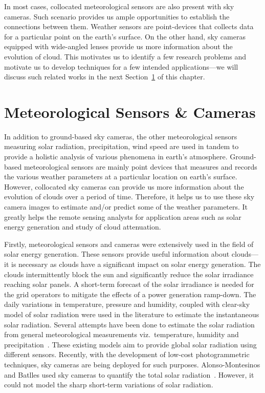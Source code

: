 In most cases, collocated meteorological sensors are also present with sky cameras. Such scenario provides us ample opportunities to establish the connections between them. Weather sensors are point-devices that collects data for a particular point on the earth's surface. On the other hand, sky cameras equipped with wide-angled lenses provide us more information about the evolution of cloud. This motivates us to identify a few research problems and motivate us to develop techniques for a few intended applications---we will discuss such related works in the next Section~\ref{sec:lit-sensor} of this chapter.

\section{Meteorological Sensors \& Cameras}
\label{sec:lit-sensor}
In addition to ground-based sky cameras, the other meteorological sensors measuring solar radiation, precipitation, wind speed are used in tandem to provide a holistic analysis of various phenomena in earth's atmosphere. Ground-based meteorological sensors are mainly point devices that measures and records the various weather parameters at a particular location on earth's surface. However, collocated sky cameras can provide us more information about the evolution of clouds over a period of time. Therefore, it helps us to use these sky camera images to estimate and/or predict some of the weather parameters. It greatly helps the remote sensing analysts for application areas such as solar energy generation and study of cloud attenuation. 

Firstly, meteorological sensors and cameras were extensively used in the field of solar energy generation. These sensors provide useful information about clouds---it is necessary as clouds have a significant impact on solar energy generation. The clouds intermittently block the sun and significantly reduce the solar irradiance reaching solar panels. A short-term forecast of the solar irradiance is needed for the grid operators to mitigate the effects of a power generation ramp-down. The daily variations in temperature, pressure and humidity, coupled with clear-sky model of solar radiation were used in the literature to estimate the instantaneous solar radiation. Several attempts have been done to estimate the solar radiation from general meteorological measurements viz.\ temperature, humidity and precipitation~\cite{HSmodel,DCmodel,BCmodel,Huntmodel}. These existing models aim to provide global solar radiation using different sensors. Recently, with the development of low-cost photogrammetric techniques, sky cameras are being deployed for such purposes. Alonso-Montesinos and Batlles used sky cameras to quantify the total solar radiation~\cite{alonso2015}. However, it could not model the sharp short-term variations of solar radiation.



